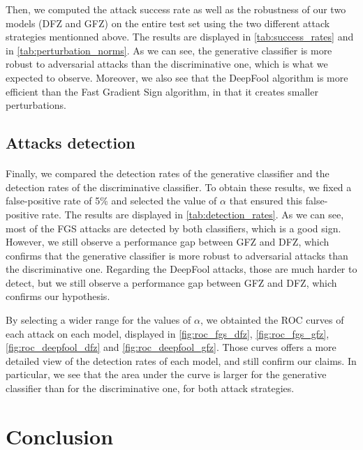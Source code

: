 \documentclass[10pt,twocolumn,letterpaper]{article}
\begin{document}
Then, we computed the attack success rate as well as the robustness of our two models (DFZ and GFZ) on the entire test set using the two different attack strategies mentionned above. The results are displayed in \cref{tab:success_rates} and in \cref{tab:perturbation_norms}. As we can see, the generative classifier is more robust to adversarial attacks than the discriminative one, which is what we expected to observe. Moreover, we also see that the DeepFool algorithm is more efficient than the Fast Gradient Sign algorithm, in that it creates smaller perturbations.

\subsection{Attacks detection}

\paragraph{} Finally, we compared the detection rates of the generative classifier and the detection rates of the discriminative classifier. To obtain these results, we fixed a false-positive rate of 5\% and selected the value of $\alpha$ that ensured this false-positive rate. The results are displayed in \cref{tab:detection_rates}. As we can see, most of the FGS attacks are detected by both classifiers, which is a good sign. However, we still observe a performance gap between GFZ and DFZ, which confirms that the generative classifier is more robust to adversarial attacks than the discriminative one. Regarding the DeepFool attacks, those are much harder to detect, but we still observe a performance gap between GFZ and DFZ, which confirms our hypothesis.

By selecting a wider range for the values of $\alpha$, we obtainted the ROC curves of each attack on each model, displayed in \cref{fig:roc_fgs_dfz}, \cref{fig:roc_fgs_gfz}, \cref{fig:roc_deepfool_dfz} and \cref{fig:roc_deepfool_gfz}. Those curves offers a more detailed view of the detection rates of each model, and still confirm our claims. In particular, we see that the area under the curve is larger for the generative classifier than for the discriminative one, for both attack strategies.

\section{Conclusion}
\label{sec:conclusion}
\end{document}
